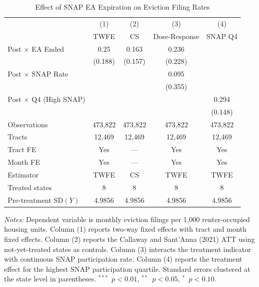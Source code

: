 \begin{table}[htbp]
\centering
\caption{Effect of SNAP EA Expiration on Eviction Filing Rates}
\label{tab:main}
\begin{tabular}{lcccc}
\toprule
 & (1) & (2) & (3) & (4) \\
 & TWFE & CS & Dose-Response & SNAP Q4 \\
\midrule
Post $\times$ EA Ended & 0.25 & 0.163 & 0.236 & \\
 & (0.188) & (0.157) & (0.228) & \\
Post $\times$ SNAP Rate & & & 0.095 & \\
 & & & (0.355) & \\
Post $\times$ Q4 (High SNAP) & & & & 0.294 \\
 & & & & (0.148) \\
\midrule
Observations & 473,822 & 473,822 & 473,822 & 473,822 \\
Tracts & 12,469 & 12,469 & 12,469 & 12,469 \\
Tract FE & Yes & --- & Yes & Yes \\
Month FE & Yes & --- & Yes & Yes \\
Estimator & TWFE & CS & TWFE & TWFE \\
Treated states & 8 & 8 & 8 & 8 \\
Pre-treatment SD$(Y)$ & 4.9856 & 4.9856 & 4.9856 & 4.9856 \\
\bottomrule
\end{tabular}
\begin{tablenotes}
\item \textit{Notes:} Dependent variable is monthly eviction filings per 1,000 renter-occupied housing units. Column (1) reports two-way fixed effects with tract and month fixed effects. Column (2) reports the Callaway and Sant'Anna (2021) ATT using not-yet-treated states as controls. Column (3) interacts the treatment indicator with continuous SNAP participation rate. Column (4) reports the treatment effect for the highest SNAP participation quartile. Standard errors clustered at the state level in parentheses. $^{***}$~$p<0.01$, $^{**}$~$p<0.05$, $^{*}$~$p<0.10$.
\end{tablenotes}
\end{table}

